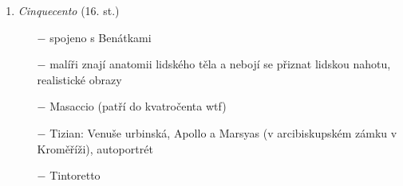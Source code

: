 \documentclass{article}
\begin{document}
\begin{enumerate}
\begin{itemize}
    \end{itemize}
    \item \textit{Cinquecento} (16. st.)
    \begin{itemize}
        \vspace{-0.5em}
        \setlength\itemsep{0.15em}
        \item[$-$] spojeno s Benátkami
        \item[$-$] malíři znají anatomii lidského těla a nebojí se přiznat lidskou nahotu, realistické obrazy
        \item[$-$] Masaccio (patří do kvatročenta wtf)
        \item[$-$] Tizian: Venuše urbinská, Apollo a Marsyas (v arcibiskupském zámku v Kroměříži), autoportrét
        \item[$-$] Tintoretto
    \end{itemize}
\end{enumerate}
\end{document}
